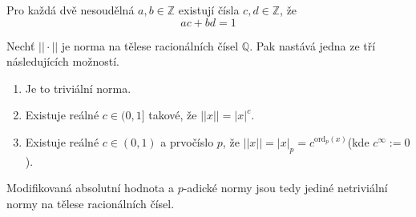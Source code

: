 \documentclass[../main.tex]{subfiles}
\begin{document}
\begin{lemma}
    Pro každá dvě nesoudělná $a,b \in\mathbb{Z}$ existují čísla $c,d\in\mathbb{Z}$, že
    \[ ac + bd = 1 \]
\end{lemma}

\begin{theorem}[A. Ostrowski]
    Nechť $||\cdot||$ je norma na tělese racionálních čísel $\mathbb{Q}$. Pak nastává jedna ze tří následujících možností.
    \begin{enumerate}
        \item Je to triviální norma.
        \item Existuje reálné $c\in (0,1]$ takové, že $||x|| = |x|^c$.
        \item Existuje reálné $c \in (0,1)$ a prvočíslo $p$, že $||x|| = |x|_p = c^{\text{ord}_p(x)}$(kde $c^\infty := 0$).
    \end{enumerate}
    Modifikovaná absolutní hodnota a $p$-adické normy jsou tedy jediné netriviální
    normy na tělese racionálních čísel.
\end{theorem}
\end{document}
